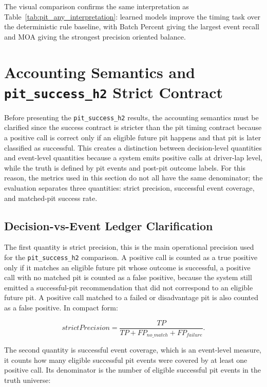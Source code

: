 The visual comparison confirms the same interpretation as Table~\ref{tab:pit_any_interpretation}: learned models improve the timing task over the
deterministic rule baseline, with Batch Percent giving the largest event recall and MOA giving the strongest precision oriented balance.


\section{Accounting Semantics and \texttt{pit\_success\_h2} Strict Contract}

Before presenting the \texttt{pit\_success\_h2} results, the accounting semantics must be clarified since the success contract is stricter than the pit timing contract because a
positive call is correct only if an eligible future pit happens and that pit is later classified as successful.
This creates a distinction between decision-level quantities and event-level quantities because a system emits positive calls at driver-lap level, while the truth is defined by
pit events and post-pit outcome labels. For this reason, the metrics used in this section do not all have the same denominator; the evaluation separates three quantities:
strict precision, successful event coverage, and matched-pit success rate.

\subsection{Decision-vs-Event Ledger Clarification}

The first quantity is strict precision, this is the main operational precision used for the \texttt{pit\_success\_h2} comparison. A positive call is counted as a true
positive only if it matches an eligible future pit whose outcome is successful, a positive call with no matched pit is counted as a false positive, because the system
still emitted a successful-pit recommendation that did not correspond to an eligible future pit. A positive call matched to a failed or disadvantage pit is also counted
as a false positive. In compact form:

\[
    strictPrecision =
    \frac{TP}{TP + FP_{no\_match} + FP_{failure}}.
\]

The second quantity is successful event coverage, which is an event-level measure, it counts how many eligible successful pit events were covered by at least one positive call.
Its denominator is the number of eligible successful pit events in the truth universe:

